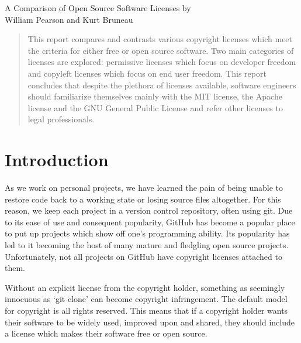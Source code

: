 \documentclass[12pt,letterpaper]{article}
\begin{document}
\thispagestyle{empty}

\begin{titlepage}
\vspace*{1.5in}
\begin{center}
  \huge A Comparison of Open Source Software Licenses
  \vskip1.5in
  \large by \\
  \large William Pearson and Kurt Bruneau \\
\end{center}
\end{titlepage}


\tableofcontents
\listoffigures
\newpage

\begin{abstract}
This report compares and contrasts various copyright licenses which meet the criteria for either free or open source software. Two main categories of licenses are explored: permissive licenses which focus on developer freedom and copyleft licenses which focus on end user freedom. This report concludes that despite the plethora of licenses available, software engineers should familiarize themselves mainly with the MIT license, the Apache license and the GNU General Public License and refer other licenses to legal professionals.
\end{abstract}
\newpage
\thispagestyle{empty}
\setcounter{page}{1}

\section{Introduction}

As we work on personal projects, we have learned the pain of being unable to restore code back to a working state or losing source files altogether. For this reason, we keep each project in a version control repository, often using git. Due to its ease of use and consequent popularity, GitHub has become a popular place to put up projects which show off one's programming ability. Its popularity has led to it becoming the host of many mature and fledgling open source projects. Unfortunately, not all projects on GitHub have copyright licenses attached to them.

Without an explicit license from the copyright holder, something as seemingly innocuous as `git clone' can become copyright infringement. The default model for copyright is all rights reserved. This means that if a copyright holder wants their software to be widely used, improved upon and shared, they should include a license which makes their software free or open source.\cite{nolicense}
\end{document}
